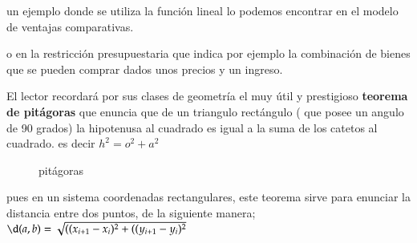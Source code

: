 \documentclass[12pt]{article}
\begin{document}
\newpage







un ejemplo donde se utiliza la función lineal lo podemos encontrar en el modelo de ventajas comparativas.

o en la restricción presupuestaria que indica por ejemplo la combinación de bienes que se pueden comprar dados unos precios y un ingreso.





El lector recordará por sus clases de geometría el muy útil y prestigioso \textbf{teorema de pitágoras} que enuncia que de un triangulo rectángulo ( que posee un angulo de 90 grados)  la hipotenusa al cuadrado es igual a la suma de los catetos al cuadrado. es decir $h^{2}= o^{2}+a^{2}$


\begin{figure}

\begin{center}

\caption{pitágoras}


\end{center}

\end{figure}




pues en un sistema coordenadas rectangulares, este teorema sirve para enunciar la distancia entre dos puntos, de la siguiente manera; $\d(a,b)=\sqrt{((x_{i+1}-x_{i})^{2} + ((y_{i+1}-y_{i})^{2}}$
\end{document}
